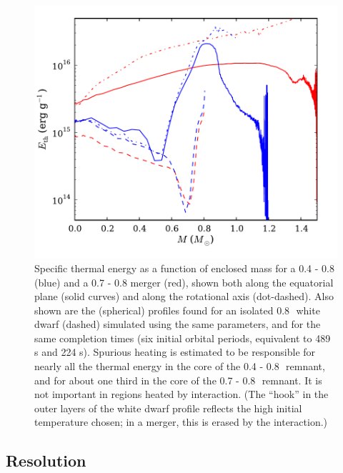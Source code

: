 \begin{figure}
\centering
\includegraphics[angle=0,width=0.5\columnwidth]{chapter2_zhu+13/figures/heatingTEC.pdf}
\caption{Specific thermal energy as a function of enclosed mass for a 0.4 - 0.8 {\Msun} (blue) and a 0.7 - 0.8 {\Msun} merger (red), shown both along the equatorial plane (solid curves) and along the rotational axis (dot-dashed).  Also shown are the (spherical) profiles found for an isolated 0.8\,\Msun\ white dwarf (dashed) simulated using the same parameters, and for the same completion times (six initial orbital periods, equivalent to 489 s and 224 s).  Spurious heating is estimated to be responsible for nearly all the thermal energy in the core of the 0.4 - 0.8\,\Msun\ remnant, and for about one third in the core of the 0.7 - 0.8\,\Msun\ remnant.  It is not important in regions heated by interaction.  (The ``hook'' in the outer layers of the white dwarf profile reflects the high initial temperature chosen; in a merger, this is erased by the interaction.)}
\label{fig:c2_heating}
\end{figure}

\subsection{Resolution}
\label{ssec:c2_restest}



